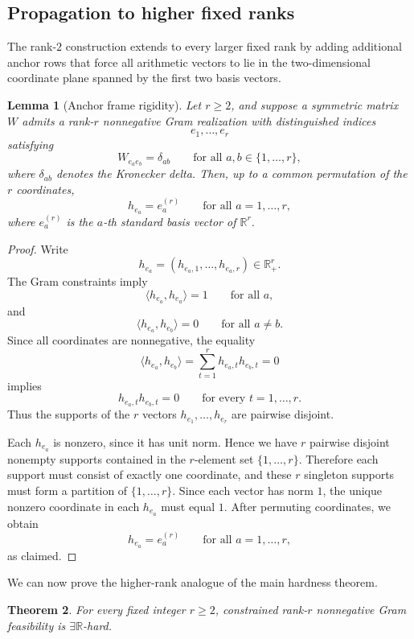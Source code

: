\documentclass[11pt]{article}
\newtheorem{theorem}{Theorem}[section]
\newtheorem{lemma}[theorem]{Lemma}
\begin{document}
\subsection{Propagation to higher fixed ranks}

The rank-$2$ construction extends to every larger fixed rank by adding
additional anchor rows that force all arithmetic vectors to lie in the
two-dimensional coordinate plane spanned by the first two basis vectors.

\begin{lemma}[Anchor frame rigidity]
\label{lem:anchor-frame-rigidity}
Let \(r\ge 2\), and suppose a symmetric matrix \(W\) admits a rank-$r$
nonnegative Gram realization with distinguished indices
\[
e_1,\dots,e_r
\]
satisfying
\[
W_{e_a e_b}=\delta_{ab}
\qquad \text{for all } a,b\in\{1,\dots,r\},
\]
where \(\delta_{ab}\) denotes the Kronecker delta. Then, up to a common
permutation of the \(r\) coordinates,
\[
h_{e_a}=e_a^{(r)}
\qquad \text{for all } a=1,\dots,r,
\]
where \(e_a^{(r)}\) is the \(a\)-th standard basis vector of
\(\mathbb{R}^r\).
\end{lemma}

\begin{proof}
Write
\[
h_{e_a}=(h_{e_a,1},\dots,h_{e_a,r})\in\mathbb{R}_+^r.
\]
The Gram constraints imply
\[
\langle h_{e_a},h_{e_a}\rangle = 1
\qquad \text{for all } a,
\]
and
\[
\langle h_{e_a},h_{e_b}\rangle = 0
\qquad \text{for all } a\neq b.
\]
Since all coordinates are nonnegative, the equality
\[
\langle h_{e_a},h_{e_b}\rangle
=
\sum_{t=1}^r h_{e_a,t} h_{e_b,t}
=
0
\]
implies
\[
h_{e_a,t} h_{e_b,t}=0
\qquad \text{for every } t=1,\dots,r.
\]
Thus the supports of the \(r\) vectors \(h_{e_1},\dots,h_{e_r}\) are pairwise
disjoint.

Each \(h_{e_a}\) is nonzero, since it has unit norm. Hence we have \(r\)
pairwise disjoint nonempty supports contained in the \(r\)-element set
\(\{1,\dots,r\}\). Therefore each support must consist of exactly one
coordinate, and these \(r\) singleton supports must form a partition of
\(\{1,\dots,r\}\). Since each vector has norm \(1\), the unique nonzero
coordinate in each \(h_{e_a}\) must equal \(1\). After permuting coordinates,
we obtain
\[
h_{e_a}=e_a^{(r)}
\qquad \text{for all } a=1,\dots,r,
\]
as claimed.
\end{proof}

We can now prove the higher-rank analogue of the main hardness theorem.

\begin{theorem}
\label{thm:hardness-fixed-r}
For every fixed integer \(r\ge 2\), constrained rank-$r$ nonnegative Gram
feasibility is \(\exists\mathbb{R}\)-hard.
\end{theorem}
\end{document}
